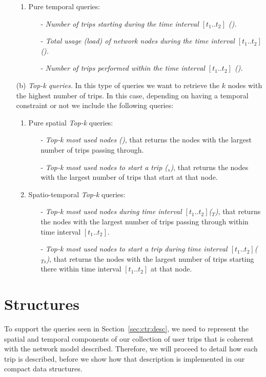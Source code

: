 \begin{itemize}
\begin{enumerate}
			\item Pure temporal queries:
			\begin{itemize}
				\item[-] {\em Number of trips starting during the time interval $[t_1..t_2]$ (\startT). } 
				\item[-] {\em Total usage (load) of network nodes during the time interval $[t_1..t_2]$ (\loadT).}
				\item[-] {\em Number of trips performed within the time interval $[t_1..t_2]$ (\tripT).} 
			\end{itemize}
		\end{enumerate}
		
		\item[(b)] {\em Top-k queries.} In this type of queries we want to retrieve the $k$ nodes with the highest number of trips. In this case, depending on having a temporal constraint or not we include the following queries:
		\begin{enumerate}
			\item Pure spatial {\em Top-k} queries:
			\begin{itemize}
				\item[-] {\em Top-k most used nodes (\topK)}, that returns the nodes with the largest number of trips passing through.
				\item[-] {\em Top-k most used nodes to start a trip (\topK$_s$)}, that returns the nodes with the largest number of trips that start at that node.
			\end{itemize}
			
			\item Spatio-temporal {\em Top-k}  queries:
			\begin{itemize}
				\item[-] {\em Top-k most used nodes during time interval $[t_1..t_2]$(\topK$_T$)}, that returns the nodes with the largest number of trips passing through within time interval $[t_1..t_2]$. 
				\item[-] {\em Top-k most used nodes to start a trip during time interval $[t_1..t_2]$(\topK$_{Ts}$)}, that returns the nodes with the largest number of trips starting there within time interval $[t_1..t_2]$ at that node.
			\end{itemize}
		\end{enumerate}
	\end{itemize}

\section{Structures}
\label{sec:ctr:str}
	To support the queries seen in Section~\ref{sec:ctr:desc}, we need to represent the spatial and temporal components of our collection of user trips that is coherent with the network model described. Therefore, we will proceed to detail how each trip is described, before we show how that description is implemented in our compact data structures.

